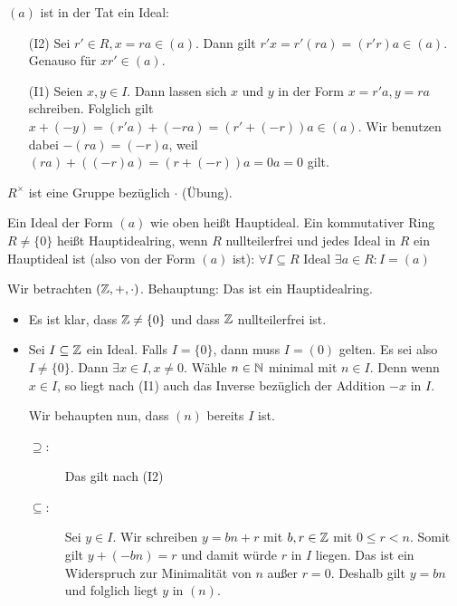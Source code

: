 \documentclass[12pt,a4paper]{scrartcl}
\begin{document}
\begin{bem}
	$(a)$ ist in der Tat ein Ideal:\begin{itemize}
		\item[(I2)] Sei $r' \in R, x = ra\in (a)$. Dann gilt $r'x  = r' (ra) = (r'r)a \in (a)$. Genauso für $xr'\in (a)$.
		\item[(I1)] Seien $x,y\in I$. Dann lassen sich $x$ und $y$ in der Form $x = r'a, y = ra$ schreiben. Folglich gilt $x+(-y) = (r'a)+(-ra) = (r'+(-r))a \in (a)$. Wir benutzen dabei $-(ra) = (-r)a$, weil $(ra)+((-r)a) = (r+(-r))a = 0a = 0$ gilt.
	\end{itemize}
\end{bem}
\begin{bem}
	$R^{\times}$ ist eine Gruppe bezüglich $\cdot$ (Übung).
\end{bem}

\begin{defi}
	Ein Ideal der Form $(a)$ wie oben heißt Hauptideal. Ein kommutativer Ring $R\neq\{0\}$ heißt Hauptidealring, wenn $R$ nullteilerfrei und jedes Ideal in $R$ ein Hauptideal ist (also von der Form $(a)$ ist): $\forall I\subseteq R\text{ Ideal }\exists a\in R: I = (a)$
\end{defi}

\begin{bsp}
	Wir betrachten $(\mathbb Z,+,\cdot)$. Behauptung: Das ist ein Hauptidealring.
	\begin{itemize}
		\item Es ist klar, dass $\mathbb Z \neq \{0\}$ und dass $\mathbb Z$ nullteilerfrei ist.
		\item Sei $I \subseteq \mathbb Z$ ein Ideal. Falls $I = \{0\}$, dann muss $I = (0)$ gelten. Es sei also $I \neq \{0\}$. Dann $\exists x\in I, x\neq 0$. Wähle $n\in\mathbb N$ minimal mit $n\in I$. Denn wenn $x \in I$, so liegt nach (I1) auch das Inverse bezüglich der Addition $-x$ in $I$.
		
		Wir behaupten nun, dass $(n)$ bereits $I$ ist.
		\begin{description}
			\item[\glqq $\supseteq$\grqq:] Das gilt nach (I2)
			\item[\glqq $\subseteq$\grqq:] Sei $y\in I$. Wir schreiben $y = bn+r$ mit $b,r\in\mathbb Z$ mit $0\leq r< n$. Somit gilt $ y+(-bn) = r$ und damit würde $r$ in $I$ liegen. Das ist ein Widerspruch zur Minimalität von $n$ außer $r = 0$. Deshalb gilt $y = bn$ und folglich liegt $y$ in $(n)$.
		\end{description} 
	\end{itemize}
\end{bsp}
\end{document}
